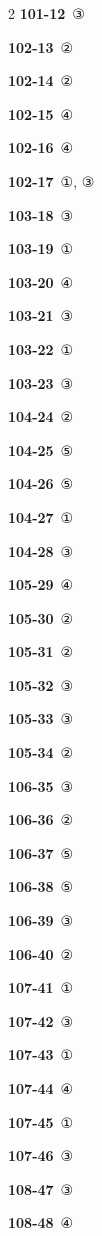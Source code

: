 \documentclass[10pt,a4paper]{article}
\begin{document}
\begin{multicols}{2}
\noindent\textbf{101-12}\ ③\par
\noindent\textbf{102-13}\ ②\par
\noindent\textbf{102-14}\ ②\par
\noindent\textbf{102-15}\ ④\par
\noindent\textbf{102-16}\ ④\par
\noindent\textbf{102-17}\ ①, ③\par
\noindent\textbf{103-18}\ ③\par
\noindent\textbf{103-19}\ ①\par
\noindent\textbf{103-20}\ ④\par
\noindent\textbf{103-21}\ ③\par
\noindent\textbf{103-22}\ ①\par
\noindent\textbf{103-23}\ ③\par
\noindent\textbf{104-24}\ ②\par
\noindent\textbf{104-25}\ ⑤\par
\noindent\textbf{104-26}\ ⑤\par
\noindent\textbf{104-27}\ ①\par
\noindent\textbf{104-28}\ ③\par
\noindent\textbf{105-29}\ ④\par
\noindent\textbf{105-30}\ ②\par
\noindent\textbf{105-31}\ ②\par
\noindent\textbf{105-32}\ ③\par
\noindent\textbf{105-33}\ ③\par
\noindent\textbf{105-34}\ ②\par
\noindent\textbf{106-35}\ ③\par
\noindent\textbf{106-36}\ ②\par
\noindent\textbf{106-37}\ ⑤\par
\noindent\textbf{106-38}\ ⑤\par
\noindent\textbf{106-39}\ ③\par
\noindent\textbf{106-40}\ ②\par
\noindent\textbf{107-41}\ ①\par
\noindent\textbf{107-42}\ ③\par
\noindent\textbf{107-43}\ ①\par
\noindent\textbf{107-44}\ ④\par
\noindent\textbf{107-45}\ ①\par
\noindent\textbf{107-46}\ ③\par
\noindent\textbf{108-47}\ ③\par
\noindent\textbf{108-48}\ ④\par

\end{multicols}
\end{document}
